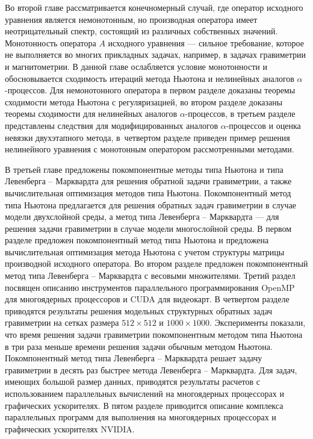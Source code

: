 Во второй главе рассматривается конечномерный случай, где оператор исходного уравнения является немонотонным, но производная оператора имеет неотрицательный спектр, состоящий из различных собственных значений. Монотонность оператора $A$ исходного уравнения --- сильное требование, которое не выполняется во многих прикладных задачах, например, в задачах гравиметрии и магнитометрии. В данной главе ослабляется условие монотонности и обосновывается сходимость итераций метода Ньютона и нелинейных аналогов $\alpha$-процессов. Для немонотонного оператора в первом разделе доказаны теоремы сходимости метода Ньютона с регуляризацией, во втором разделе доказаны теоремы сходимости для нелинейных аналогов $\alpha$-процессов, в третьем разделе представлены следствия для модифицированных аналогов $\alpha$-процессов и оценка невязки двухэтапного метода, в~четвертом разделе приведен пример решения нелинейного уравнения с монотонным оператором рассмотренными методами.

В третьей главе предложены покомпонентные методы типа Ньютона и типа Левенберга -- Марквардта для решения обратной задачи гравиметрии, а также вычислительная оптимизация методов типа Ньютона. Покомпонентный метод типа Ньютона предлагается для решения обратных задач гравиметрии в случае модели двухслойной среды, а метод типа Левенберга -- Марквардта --- для решения задачи гравиметрии в случае модели многослойной среды. В первом разделе предложен покомпонентный метод типа Ньютона и предложена вычислительная оптимизация метода Ньютона с учетом структуры матрицы производной исходного оператора. Во втором разделе предложен покомпонентный метод типа Левенберга -- Марквардта с весовыми множителями. Третий раздел посвящен описанию инструментов параллельного программирования OpenMP для многоядерных процессоров и CUDA для видеокарт. В четвертом разделе приводятся результаты решения модельных структурных обратных задач гравиметрии на сетках размера $512\times 512$ и $1000\times 1000$. Эксперименты показали, что время решения задачи гравиметрии покомпонентным методом типа Ньютона в три раза меньше времени решения задачи обычным методом Ньютона. Покомпонентный метод типа Левенберга -- Марквардта решает задачу гравиметрии в десять раз быстрее метода Левенберга -- Марквардта. Для задач, имеющих большой размер данных, приводятся результаты расчетов с использованием параллельных вычислений на многоядерных процессорах и графических ускорителях. В пятом разделе приводится описание комплекса параллельных программ для выполнения на многоядерных процессорах и графических ускорителях NVIDIA.

